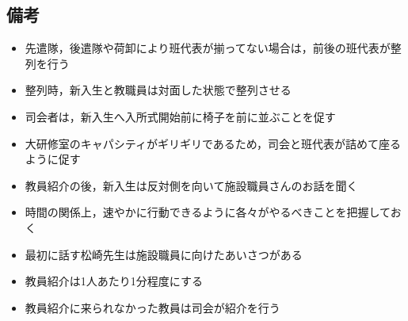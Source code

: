 \subsection{備考}
\begin{itemize}
\item 先遣隊，後遣隊や荷卸により班代表が揃ってない場合は，前後の班代表が整列を行う
\item 整列時，新入生と教職員は対面した状態で整列させる
\item 司会者は，新入生へ入所式開始前に椅子を前に並ぶことを促す
\item 大研修室のキャパシティがギリギリであるため，司会と班代表が詰めて座るように促す
\item 教員紹介の後，新入生は反対側を向いて施設職員さんのお話を聞く
\item 時間の関係上，速やかに行動できるように各々がやるべきことを把握しておく
\item 最初に話す松崎先生は施設職員に向けたあいさつがある
\item 教員紹介は1人あたり1分程度にする
\item 教員紹介に来られなかった教員は司会が紹介を行う
\end{itemize}



%
